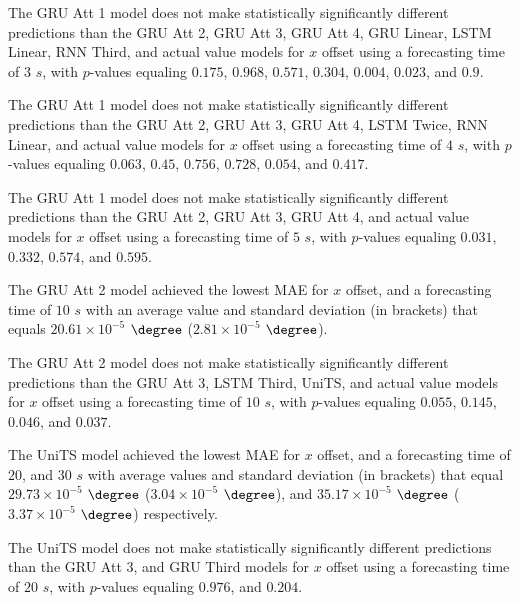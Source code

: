 The GRU Att 1 model does not make statistically significantly different predictions than the GRU Att 2, GRU Att 3, GRU Att 4, GRU Linear, LSTM Linear, RNN Third, and actual value models for $x$ offset using a forecasting time of $3$ $s$, with $p$-values equaling $0.175$, $0.968$, $0.571$, $0.304$, $0.004$, $0.023$, and $0.9$.

The GRU Att 1 model does not make statistically significantly different predictions than the GRU Att 2, GRU Att 3, GRU Att 4, LSTM Twice, RNN Linear, and actual value models for $x$ offset using a forecasting time of $4$ $s$, with $p$-values equaling $0.063$, $0.45$, $0.756$, $0.728$, $0.054$, and $0.417$.

The GRU Att 1 model does not make statistically significantly different predictions than the GRU Att 2, GRU Att 3, GRU Att 4, and actual value models for $x$ offset using a forecasting time of $5$ $s$, with $p$-values equaling $0.031$, $0.332$, $0.574$, and $0.595$.

The GRU Att 2 model achieved the lowest MAE for $x$ offset, and a forecasting time of $10$ $s$ with an average value and standard deviation (in brackets) that equals $20.61 \times 10^{-5}$ $\degree$ ($2.81 \times 10^{-5}$ $\degree$).

The GRU Att 2 model does not make statistically significantly different predictions than the GRU Att 3, LSTM Third, UniTS, and actual value models for $x$ offset using a forecasting time of $10$ $s$, with $p$-values equaling $0.055$, $0.145$, $0.046$, and $0.037$.

The UniTS model achieved the lowest MAE for $x$ offset, and a forecasting time of $20$, and $30$ $s$ with average values and standard deviation (in brackets) that equal $29.73 \times 10^{-5}$ $\degree$ ($3.04 \times 10^{-5}$ $\degree$), and $35.17 \times 10^{-5}$ $\degree$ ($3.37 \times 10^{-5}$ $\degree$) respectively.

The UniTS model does not make statistically significantly different predictions than the GRU Att 3, and GRU Third models for $x$ offset using a forecasting time of $20$ $s$, with $p$-values equaling $0.976$, and $0.204$.

